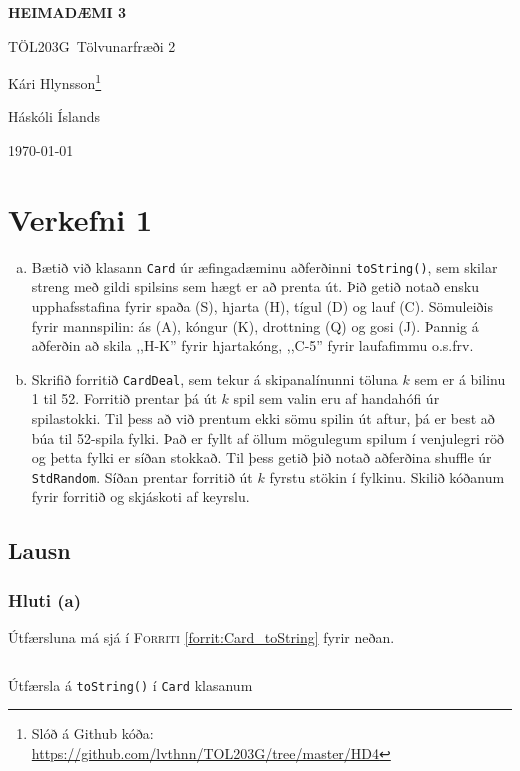 \documentclass[12pt, a4paper, hidelinks]{article}
\title{}
\newcommand{\doctitle}{\uppercase{Heimadæmi 3}}
\newcommand{\coursename}{Tölvunarfræði 2}
\newcommand{\coursenum}{TÖL203G}
\begin{document}
\thispagestyle{plain}
\centerline{\bfseries\Large\doctitle}
\medskip
\centerline{\large\coursenum\ \coursename}
\bigskip

\centerline{\large Kári Hlynsson\footnote{Slóð á Github kóða: \url{https://github.com/lvthnn/TOL203G/tree/master/HD4}}}
\bigskip
\centerline{Háskóli Íslands}
\medskip
\centerline{\today}


\section*{Verkefni 1}

\begin{enumerate}[(a)]
    \item Bætið við klasann \texttt{Card} úr æfingadæminu aðferðinni \texttt{toString()}, sem skilar
    streng með gildi spilsins sem hægt er að prenta út. Þið getið notað ensku upphafsstafina fyrir spaða
    (S), hjarta (H), tígul (D) og lauf (C). Sömuleiðis fyrir mannspilin: ás (A), kóngur (K), drottning (Q)
    og gosi (J). Þannig á aðferðin að skila ,,H-K'' fyrir hjartakóng, ,,C-5'' fyrir laufafimmu o.s.frv.

    \item Skrifið forritið \texttt{CardDeal}, sem tekur á skipanalínunni töluna $k$ sem er á bilinu 1 til 52.
    Forritið prentar þá út $k$ spil sem valin eru af handahófi úr spilastokki. Til þess að við prentum ekki sömu
    spilin út aftur, þá er best að búa til 52-spila fylki. Það er fyllt af öllum mögulegum spilum í venjulegri röð
    og þetta fylki er síðan stokkað. Til þess getið þið notað aðferðina shuffle úr \texttt{StdRandom}. Síðan prentar
    forritið út $k$ fyrstu stökin í fylkinu. Skilið kóðanum fyrir forritið og skjáskoti af keyrslu.
\end{enumerate}

\subsection*{Lausn}
\subsubsection*{Hluti (a)}
Útfærsluna má sjá í \textsc{Forriti} \ref{forrit:Card_toString} fyrir neðan.

\begin{listing}[H]
    \centering
    \inputminted[linenos, breaklines, firstline=21, lastline=25]{java}{../src/V1/Card.java}
    \caption{Útfærsla á \texttt{toString()} í \texttt{Card} klasanum}
    \label{forrit:Card_toString}
\end{listing}
\end{document}
